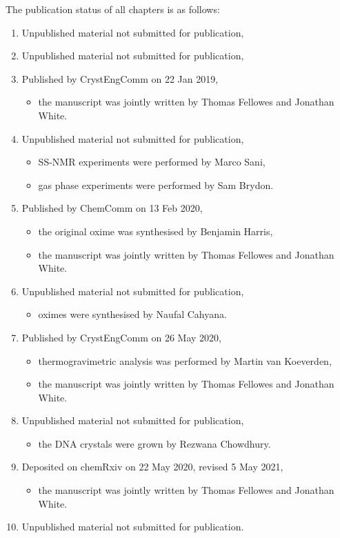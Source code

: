 {The publication status of all chapters is as follows:
\begin{enumerate}
    \item Unpublished material not submitted for publication,
    \item Unpublished material not submitted for publication,
    \item Published by CrystEngComm on 22 Jan 2019,
    \begin{itemize}
        \item the manuscript was jointly written by Thomas Fellowes and Jonathan White.
    \end{itemize}
    \item Unpublished material not submitted for publication,
    \begin{itemize}
        \item SS-NMR experiments were performed by Marco Sani,
        \item gas phase experiments were performed by Sam Brydon.
    \end{itemize}
    \item Published by ChemComm on 13 Feb 2020,
    \begin{itemize}
        \item the original oxime  was synthesised by Benjamin Harris,
        \item the manuscript was jointly written by Thomas Fellowes and Jonathan White.
    \end{itemize}
    \item Unpublished material not submitted for publication,
    \begin{itemize}
        \item oximes  were synthesised by Naufal Cahyana.
    \end{itemize}
    \item Published by CrystEngComm on 26 May 2020,
    \begin{itemize}
        \item thermogravimetric analysis was performed by Martin van Koeverden,
        \item the manuscript was jointly written by Thomas Fellowes and Jonathan White.
    \end{itemize}
    \item Unpublished material not submitted for publication,
    \begin{itemize}
        \item the DNA crystals were grown by Rezwana Chowdhury.
    \end{itemize}
    \item Deposited on chemRxiv on 22 May 2020, revised 5 May 2021,
    \begin{itemize}
        \item the manuscript was jointly written by Thomas Fellowes and Jonathan White.
    \end{itemize}
    \item Unpublished material not submitted for publication.
\end{enumerate}
}